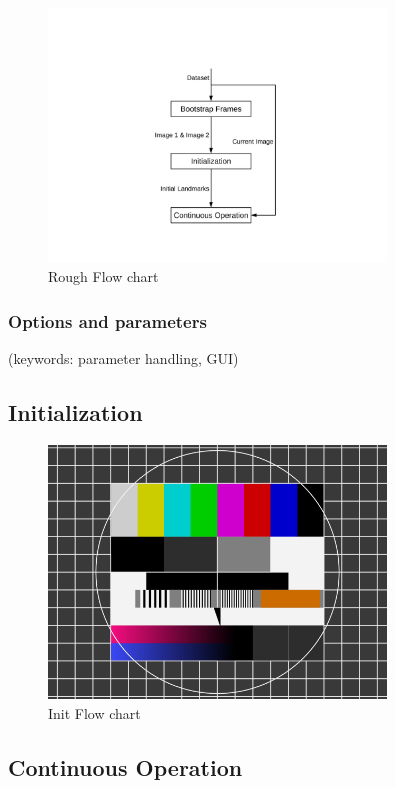 \documentclass[a4paper,10pt]{article} %
\begin{document}
\begin{figure}[ht]
	\includegraphics[width=0.8\textwidth]{rough_flow2}
	\caption{Rough Flow chart}
	\label{img_flow_rough}
\end{figure}
%
\subsubsection{Options and parameters}
(keywords: parameter handling, GUI)



\subsection{Initialization}
\label{sec_init}


\begin{figure}[ht]
	\includegraphics[width=0.8\textwidth]{test}
	\caption{Init Flow chart}
	\label{img_flow_init}
\end{figure}


\subsection{Continuous Operation}
\label{sec_cont_op}
\end{document}
